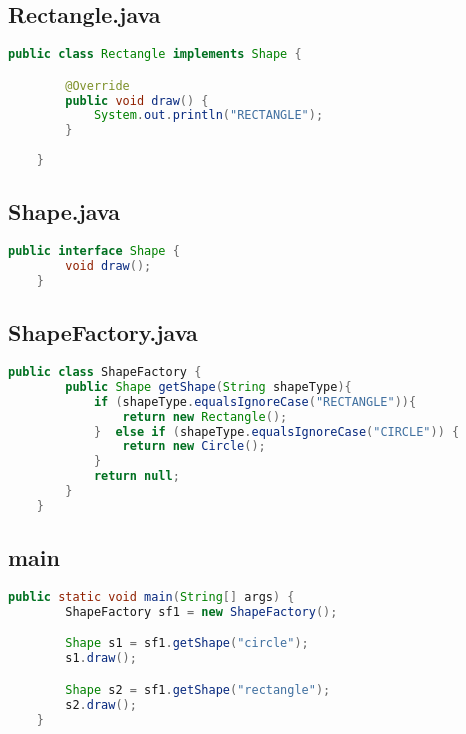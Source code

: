 \subsection{Rectangle.java}
\begin{lstlisting}[language=java]
    public class Rectangle implements Shape {

        @Override
        public void draw() {
            System.out.println("RECTANGLE");
        }
        
    }
\end{lstlisting}

\subsection{Shape.java}
\begin{lstlisting}[language=java]
    public interface Shape {
        void draw();
    }
\end{lstlisting}

\subsection{ShapeFactory.java}
\begin{lstlisting}[language=java]
    public class ShapeFactory {
        public Shape getShape(String shapeType){
            if (shapeType.equalsIgnoreCase("RECTANGLE")){
                return new Rectangle();
            }  else if (shapeType.equalsIgnoreCase("CIRCLE")) {
                return new Circle();
            }
            return null;
        }
    }
\end{lstlisting}

\subsection{main}
\begin{lstlisting}[language=java]
    public static void main(String[] args) {
        ShapeFactory sf1 = new ShapeFactory();

        Shape s1 = sf1.getShape("circle");
        s1.draw();

        Shape s2 = sf1.getShape("rectangle");
        s2.draw();
    }
\end{lstlisting}